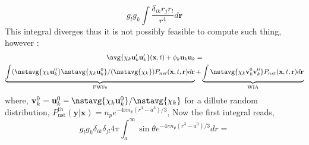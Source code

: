 \begin{equation}    
g_l  g_k
\int 
\frac{\delta_{ik} r_jr_l}{r^4} 
d\textbf{r}
\end{equation}
This integral diverges thus it is not possibly feasible to compute such thing,
however : 
\begin{multline*}
    \avg{\chi_k \textbf{u}'_k\textbf{u}'_k}(\textbf{x},t)
    + \phi_k \textbf{u}_k\textbf{u}_k
    = \\
    \underbrace{\int (\nstavg{\chi_k \textbf{u}^0_k}  \nstavg{\chi_k \textbf{u}^0_k} / (\nstavg{\chi_k})  P_{nst}(\textbf{x},t,\textbf{r}) d\textbf{r} }_\text{PWFs}
    +\underbrace{\int \nstavg{\chi_k \textbf{v}_k^0\textbf{v}_k^0}  P_{nst}(\textbf{x},t,\textbf{r}) d\textbf{r}}_\text{WIA}
    \label{eq:def_uu}
\end{multline*}
where, $\textbf{v}_k^0  = \textbf{u}_k^0 - \nstavg{\chi_k \textbf{u}^0_k} / \nstavg{\chi_k}$ 
for a dillute random distribution, $P_\text{nst}^\text{th}(\textbf{y}|\textbf{x}) = n_p e^{-4 \pi n_p (r^3 - a^3)/3}$,
Now the first integral reads, 
\begin{equation}
    g_lg_k \delta_{ik} \delta_{jl} 
    4\pi    
    \int_a^{\infty} 
    \sin\theta e^{-4 \pi n_p (r^3 - a^3)/3} dr 
    = 
\end{equation}